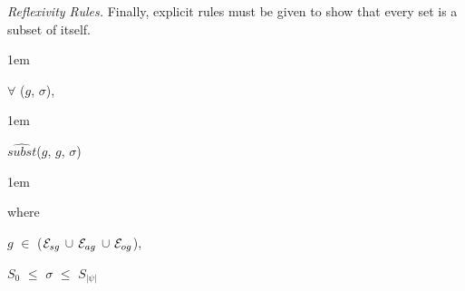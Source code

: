 \documentclass[11pt]{report}
\newenvironment{vquote}
{
  \begin{list}{}{\leftmargin 1em}\item[]
}
{
  \end{list}
}
\begin{document}
\begin{enumerate}
            \item
              {\em Reflexivity Rules.}
              Finally, explicit rules must be given to show that every set is
              a subset of itself.

              \begin{vquote}
                $\forall$ ($g$, $\sigma$),
              \end{vquote}

              \begin{vquote}
                $\hat{subst}$($g$, $g$, $\sigma$)
              \end{vquote}

              \begin{vquote}
                where

                \hspace{1em}
                $g$ $\in$
                  (${\cal E}_{sg}$ $\cup$ ${\cal E}_{ag}$ $\cup$ ${\cal E}_{og}$),

                \hspace{1em}
                $S_{0}$ $\leq$ $\sigma$ $\leq$ $S_{|\psi|}$
              \end{vquote}
          \end{enumerate}
\end{document}
